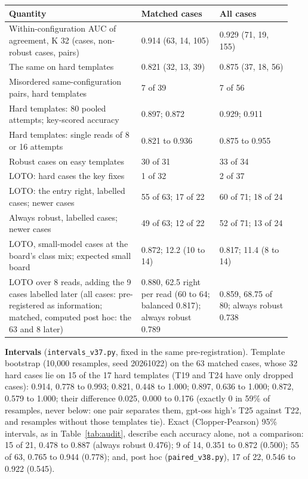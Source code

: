 \documentclass{article}
\begin{document}
\begin{center}
\footnotesize
\setlength{\tabcolsep}{4pt}
\begin{tabular}{@{}p{0.44\linewidth}p{0.26\linewidth}p{0.24\linewidth}@{}}
\toprule
Quantity & Matched cases & All cases \\
\midrule
Within-configuration AUC of agreement, K 32 (cases, non-robust cases, pairs) & 0.914 (63, 14, 105) & 0.929 (71, 19, 155) \\
The same on hard templates & 0.821 (32, 13, 39) & 0.875 (37, 18, 56) \\
Misordered same-configuration pairs, hard templates & 7 of 39 & 7 of 56 \\
Hard templates: 80 pooled attempts; key-scored accuracy & 0.897; 0.872 & 0.929; 0.911 \\
Hard templates: single reads of 8 or 16 attempts & 0.821 to 0.936 & 0.875 to 0.955 \\
Robust cases on easy templates & 30 of 31 & 33 of 34 \\
LOTO: hard cases the key fixes & 1 of 32 & 2 of 37 \\
LOTO: the entry right, labelled cases; newer cases & 55 of 63; 17 of 22 & 60 of 71; 18 of 24 \\
Always robust, labelled cases; newer cases & 49 of 63; 12 of 22 & 52 of 71; 13 of 24 \\
LOTO, small-model cases at the board's class mix; expected small board & 0.872; 12.2 (10 to 14) & 0.817; 11.4 (8 to
14) \\
LOTO over 8 reads, adding the 9 cases labelled later (all cases: pre-registered as information; matched, computed post
hoc: the 63 and 8 later) & 0.880, 62.5 right
per read (60 to 64; balanced 0.817); always robust 0.789 & 0.859, 68.75 of 80; always robust 0.738 \\
\bottomrule
\end{tabular}
\end{center}

\textbf{Intervals} (\texttt{intervals\_v37.py}, fixed in the same pre-registration). Template bootstrap (10,000
resamples, seed 20261022) on the 63 matched cases, whose 32 hard cases lie on 15 of the 17 hard templates (T19 and T24
have only dropped cases): 0.914, 0.778 to 0.993; 0.821, 0.448 to 1.000; 0.897, 0.636 to 1.000; 0.872, 0.579 to 1.000;
their difference 0.025, 0.000 to 0.176 (exactly 0 in 59\% of resamples, never below: one pair separates them, gpt-oss
high's T25 against T22, and resamples without those templates tie). Exact (Clopper-Pearson) 95\% intervals, as in
Table~\ref{tab:audit}, describe each accuracy alone, not a comparison: 15 of 21, 0.478 to 0.887 (always robust 0.476);
9 of 14, 0.351 to 0.872 (0.500); 55 of 63, 0.765 to 0.944 (0.778); and, post hoc (\texttt{paired\_v38.py}), 17 of 22,
0.546 to 0.922 (0.545).
\end{document}
